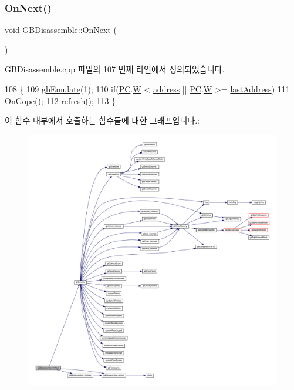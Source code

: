 \subsubsection{\texorpdfstring{On\+Next()}{OnNext()}}
{\footnotesize\ttfamily void G\+B\+Disassemble\+::\+On\+Next (\begin{DoxyParamCaption}{ }\end{DoxyParamCaption})\hspace{0.3cm}{\ttfamily [protected]}}



G\+B\+Disassemble.\+cpp 파일의 107 번째 라인에서 정의되었습니다.


\begin{DoxyCode}
108 \{
109   \mbox{\hyperlink{_g_b_8cpp_a0f6e82515034f969e357890e1718416d}{gbEmulate}}(1);
110   \textcolor{keywordflow}{if}(\mbox{\hyperlink{_g_b_disassemble_8cpp_abc78e2e4c6db630eeae9741c27e9bda3}{PC}}.\mbox{\hyperlink{uniongb_register_ab3d596e48605bc14793ff0292e6ed814}{W}} < \mbox{\hyperlink{class_g_b_disassemble_afcfc78edb6d25dc9ef3f0ae25ac6731f}{address}} || \mbox{\hyperlink{_g_b_disassemble_8cpp_abc78e2e4c6db630eeae9741c27e9bda3}{PC}}.\mbox{\hyperlink{uniongb_register_ab3d596e48605bc14793ff0292e6ed814}{W}} >= \mbox{\hyperlink{class_g_b_disassemble_ac1e3b7cd4e945eff2d9d89f14c4cbca9}{lastAddress}})
111     \mbox{\hyperlink{class_g_b_disassemble_abd524f55b59a178d22778d9e5b80905f}{OnGopc}}();
112   \mbox{\hyperlink{class_g_b_disassemble_a0ae217c08ead8a3cf62c59dadaa27fde}{refresh}}();
113 \}
\end{DoxyCode}
이 함수 내부에서 호출하는 함수들에 대한 그래프입니다.\+:
\nopagebreak
\begin{figure}[H]
\begin{center}
\leavevmode
\includegraphics[width=350pt]{class_g_b_disassemble_ac818bf955fab0b2433d68ed992033169_cgraph}
\end{center}
\end{figure}
